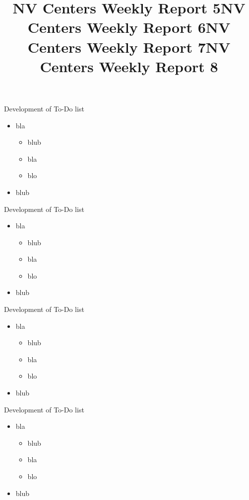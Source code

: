 \documentclass[11pt]{beamer}
\newcommand{\done}{\rlap{$\square$}{\raisebox{2pt}{\large\hspace{1pt}\ding{51}}}%
    \hspace{-2.5pt}}
\newcommand{\fail}{\rlap{$\square$}{\large\hspace{1pt}\ding{55}}}
\newcommand{\pend}{\rlap{$\square$}{\raisebox{2pt}{\large\hspace{1pt}}}%
    \hspace{6.5 pt}}
\begin{document}
\title[NV-WR5]{NV Centers Weekly Report 5} 
\begin{frame}
\titlepage 
\end{frame}
\begin{frame}{Development of To-Do list}
\begin{itemize}
\item bla
\begin{itemize}
\item[\done] blub
\item[\fail] bla
\item[\pend] blo
\end{itemize}
\item blub
\end{itemize}
\end{frame} 

\title[NV-WR6]{NV Centers Weekly Report 6} 
\begin{frame}
\titlepage 
\end{frame}
\begin{frame}{Development of To-Do list}
\begin{itemize}
\item bla
\begin{itemize}
\item[\done] blub
\item[\fail] bla
\item[\pend] blo
\end{itemize}
\item blub
\end{itemize}
\end{frame} 

\title[NV-WR7]{NV Centers Weekly Report 7} 
\begin{frame}
\titlepage 
\end{frame}
\begin{frame}{Development of To-Do list}
\begin{itemize}
\item bla
\begin{itemize}
\item[\done] blub
\item[\fail] bla
\item[\pend] blo
\end{itemize}
\item blub
\end{itemize}
\end{frame} 

\title[NV-WR8]{NV Centers Weekly Report 8} 
\begin{frame}
\titlepage 
\end{frame}
\begin{frame}{Development of To-Do list}
\begin{itemize}
\item bla
\begin{itemize}
\item[\done] blub
\item[\fail] bla
\item[\pend] blo
\end{itemize}
\item blub
\end{itemize}
\end{frame} 
\end{document}
